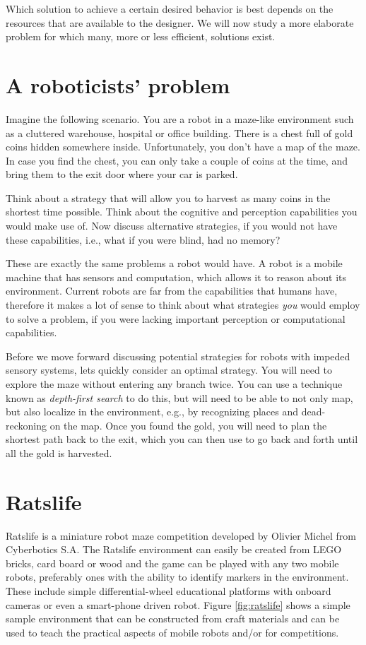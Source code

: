 Which solution to achieve a certain desired behavior is best depends on the resources that are available to the designer. We will now study a more elaborate problem for which many, more or less efficient, solutions exist.

\section{A roboticists' problem}
Imagine the following scenario. You are a robot in a maze-like environment such as a cluttered warehouse, hospital or office building. There is a chest full of gold coins hidden somewhere inside. Unfortunately, you don't have a map of the maze. In case you find the chest, you can only take a couple of coins at the time, and bring them to the exit door where your car is parked.

\begin{framed}
Think about a strategy that will allow you to harvest as many coins in the shortest time possible. Think about the cognitive and perception capabilities you would make use of. Now discuss alternative strategies, if you would not have these capabilities, i.e., what if you were blind, had no memory?
\end{framed}

These are exactly the same problems a robot would have. A robot is a mobile machine that has sensors and computation, which allows it to reason about its environment. Current robots are far from the capabilities that humans have, therefore it makes a lot of sense to think about what strategies \emph{you} would employ to solve a problem, if you were lacking important perception or computational capabilities.

Before we move forward discussing potential strategies for robots with impeded sensory systems, lets quickly consider an optimal strategy. You will need to explore the maze without entering any branch twice. You can use a technique known as \emph{depth-first search} to do this, but will need to be able to not only map, but also localize in the environment, e.g., by recognizing places and dead-reckoning on the map. Once you found the gold, you will need to plan the shortest path back to the exit, which you can then use to go back and forth until all the gold is harvested.

\section{Ratslife}\label{sec:ratslife}
Ratslife is a miniature robot maze competition developed by Olivier Michel from Cyberbotics S.A. The Ratslife environment can easily be created from LEGO bricks, card board or wood and the game can be played with any two mobile robots, preferably ones with the ability to identify markers in the environment. These include simple differential-wheel educational platforms with onboard cameras or even a smart-phone driven robot. Figure \ref{fig:ratslife} shows a simple sample environment that can be constructed from craft materials and can be used to teach the practical aspects of mobile robots and/or for competitions.


